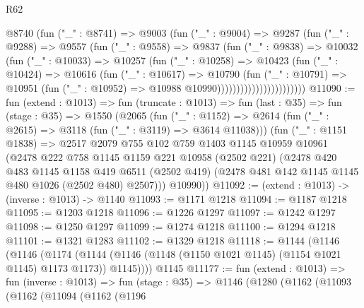 \begin{lexlean}{R62}
\begin{coremodule}
                          @8740
                            (fun ("_" : @8741) =>
                            @9003
                              (fun ("_" : @9004) =>
                              @9287
                                (fun ("_" : @9288) =>
                                @9557
                                  (fun ("_" : @9558) =>
                                  @9837
                                    (fun ("_" : @9838) =>
                                    @10032
                                      (fun ("_" : @10033) =>
                                      @10257
                                        (fun ("_" : @10258) =>
                                        @10423
                                          (fun ("_" : @10424) =>
                                          @10616
                                            (fun ("_" : @10617) =>
                                            @10790
                                              (fun ("_" : @10791) =>
                                              @10951
                                                (fun ("_" : @10952) =>
                                                @10988 @10990)))))))))))))))))))))))
@11090 := fun (extend : @1013) =>
  fun (truncate : @1013) =>
  fun (last : @35) =>
  fun (stage : @35) =>
  @1550
    (@2065
      (fun ("_" : @1152) => @2614 (fun ("_" : @2615) => @3118 (fun ("_" : @3119) => @3614 @11038)))
      (fun ("_" : @1151 @1838) =>
      @2517
        @2079
        @755
        @102
        @759
        @1403
        @1145
        @10959
        @10961
        (@2478
          @222
          @758
          @1145
          @1159
          @221
          @10958
          (@2502 @221)
          (@2478
            @420
            @483
            @1145
            @1158
            @419
            @6511
            (@2502 @419)
            (@2478 @481 @142 @1145 @1145 @480 @1026 (@2502 @480) @2507)))
        @10990))
@11092 := (extend : @1013) -> (inverse : @1013) -> @1140
@11093 := @1171 @1218
@11094 := @1187 @1218
@11095 := @1203 @1218
@11096 := @1226 @1297
@11097 := @1242 @1297
@11098 := @1250 @1297
@11099 := @1274 @1218
@11100 := @1294 @1218
@11101 := @1321 @1283
@11102 := @1329 @1218
@11118 := @1144
    (@1146
      (@1146
        (@1174 (@1144 (@1146 (@1148 (@1150 @1021 @1145) (@1154 @1021 @1145) @1173 @1173)) @1145))))
    @1145
@11177 := fun (extend : @1013) =>
  fun (inverse : @1013) =>
  fun (stage : @35) =>
  @1146
    (@1280
      (@1162
        (@11093
          (@1162
            (@11094
              (@1162
                (@1196

\end{coremodule}
\end{lexlean}
